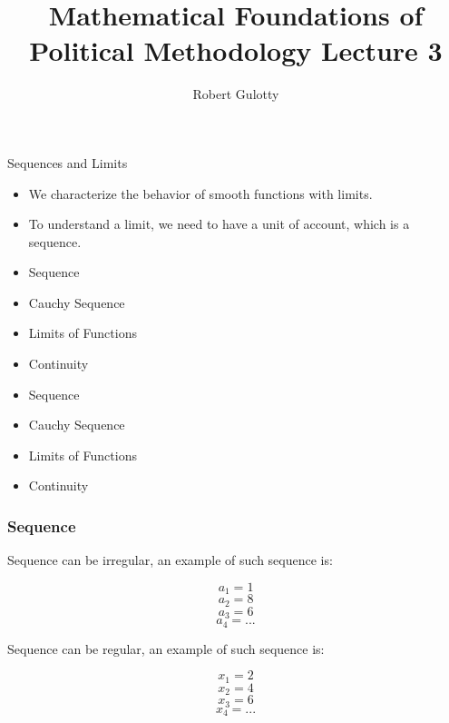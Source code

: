 \documentclass{beamer}
\title[PLSC 43401] %
{Mathematical Foundations of Political Methodology Lecture 3}
\author{Robert Gulotty}
\institute[University of Chicago]{Department of Political Science \\  University of Chicago}
\date{}
\numberwithin{equation}{section}
\begin{document}
\begin{frame}
\titlepage
\end{frame}



\begin{frame}{Sequences and Limits}
\begin{itemize}
\item We characterize the behavior of smooth functions with limits.
\item To understand a limit, we need to have a unit of account, which is a sequence.
\end{itemize}
\end{frame}


\begin{frame}

\begin{itemize}
\item \textcolor{myblack}{Sequence}

\item \textcolor{myblack}{Cauchy Sequence}
\item \textcolor{myblack}{Limits of Functions}
\item \textcolor{myblack}{Continuity}
\end{itemize}

\end{frame}



\begin{frame}

\begin{itemize}
\item \textcolor{myblack}{Sequence}
\item \textcolor{mygray}{Cauchy Sequence}
\item \textcolor{mygray}{Limits of Functions}
\item \textcolor{mygray}{Continuity}
\end{itemize}

\end{frame}


\begin{frame}
\frametitle{Sequence}

Sequence can be irregular, an example of such sequence is:

$$a_{1} = 1$$
$$a_{2} = 8$$
$$a_{3} = 6$$
$$a_{4} = ...$$

Sequence can be regular, an example of such sequence is:

$$x_{1} = 2$$
$$x_{2} = 4$$
$$x_{3} = 6$$
$$x_{4} = ...$$

\end{frame}
\end{document}
